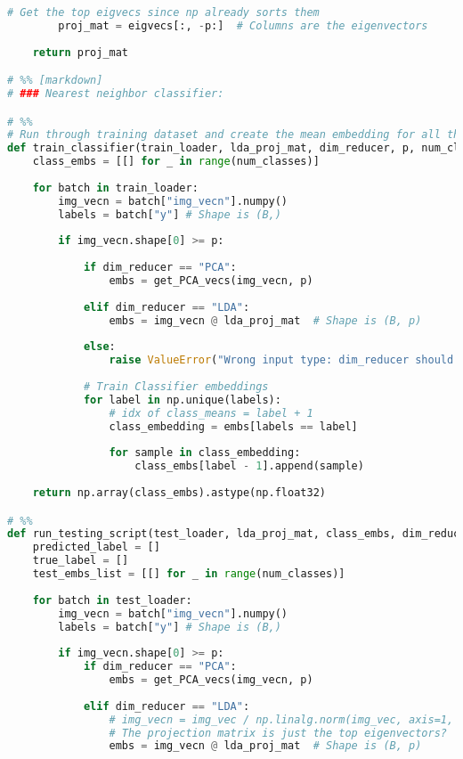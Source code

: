 \documentclass{article}
\begin{document}
\begin{lstlisting}[language=Python]
        # Get the top eigvecs since np already sorts them
        proj_mat = eigvecs[:, -p:]  # Columns are the eigenvectors
        
    return proj_mat

# %% [markdown]
# ### Nearest neighbor classifier:

# %%
# Run through training dataset and create the mean embedding for all the images belonging to that class
def train_classifier(train_loader, lda_proj_mat, dim_reducer, p, num_classes=30):
    class_embs = [[] for _ in range(num_classes)]
    
    for batch in train_loader:
        img_vecn = batch["img_vecn"].numpy()
        labels = batch["y"] # Shape is (B,)
        
        if img_vecn.shape[0] >= p:
            
            if dim_reducer == "PCA":
                embs = get_PCA_vecs(img_vecn, p)
                
            elif dim_reducer == "LDA":
                embs = img_vecn @ lda_proj_mat  # Shape is (B, p)
                
            else:
                raise ValueError("Wrong input type: dim_reducer should be PCA or LDA")
            
            # Train Classifier embeddings
            for label in np.unique(labels):
                # idx of class_means = label + 1
                class_embedding = embs[labels == label]
                
                for sample in class_embedding:
                    class_embs[label - 1].append(sample)
                        
    return np.array(class_embs).astype(np.float32)

# %%
def run_testing_script(test_loader, lda_proj_mat, class_embs, dim_reducer, num_classes=30, num_samples=21):
    predicted_label = []
    true_label = []
    test_embs_list = [[] for _ in range(num_classes)]
    
    for batch in test_loader:
        img_vecn = batch["img_vecn"].numpy()
        labels = batch["y"] # Shape is (B,)
        
        if img_vecn.shape[0] >= p:
            if dim_reducer == "PCA":
                embs = get_PCA_vecs(img_vecn, p)
                
            elif dim_reducer == "LDA":
                # img_vecn = img_vec / np.linalg.norm(img_vec, axis=1, keepdims=True) # Shapes is (B, CHW)
                # The projection matrix is just the top eigenvectors?
                embs = img_vecn @ lda_proj_mat  # Shape is (B, p)
                

\end{lstlisting}
\end{document}
